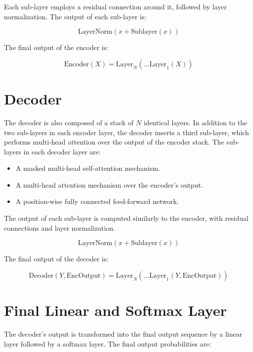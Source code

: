 Each sub-layer employs a residual connection around it, followed by layer normalization. The output of each sub-layer is:

\begin{equation}
\text{LayerNorm}(x + \text{Sublayer}(x))
\end{equation}

The final output of the encoder is:

\begin{equation}
\text{Encoder}(X) = \text{Layer}_N(\ldots \text{Layer}_1(X))
\end{equation}

\section{Decoder}

The decoder is also composed of a stack of \( N \) identical layers. In addition to the two sub-layers in each encoder layer, the decoder inserts a third sub-layer, which performs multi-head attention over the output of the encoder stack. The sub-layers in each decoder layer are:

\begin{itemize}
    \item A masked multi-head self-attention mechanism.
    \item A multi-head attention mechanism over the encoder's output.
    \item A position-wise fully connected feed-forward network.
\end{itemize}

The output of each sub-layer is computed similarly to the encoder, with residual connections and layer normalization.

\begin{equation}
\text{LayerNorm}(x + \text{Sublayer}(x))
\end{equation}

The final output of the decoder is:

\begin{equation}
\text{Decoder}(Y, \text{EncOutput}) = \text{Layer}_N(\ldots \text{Layer}_1(Y, \text{EncOutput}))
\end{equation}

\section{Final Linear and Softmax Layer}

The decoder's output is transformed into the final output sequence by a linear layer followed by a softmax layer. The final output probabilities are:

